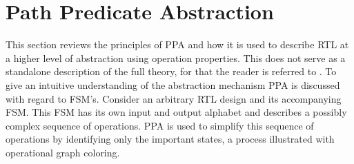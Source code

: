 \section{Path Predicate Abstraction}
\label{sec:ppa}
This section reviews the principles of PPA and how it is used to describe RTL at a higher level of abstraction using operation properties. This does not serve as a standalone description of the full theory, for that the reader is referred to \cite{2014-UrdahlStoffel.etal}. To give an intuitive understanding of the abstraction mechanism PPA is discussed with regard to FSM's. Consider an arbitrary RTL design and its accompanying FSM. This FSM has its own input and output alphabet and describes a possibly complex sequence of operations. PPA is used to simplify this sequence of operations by identifying only the important states, a process illustrated with operational graph coloring. \\ 

